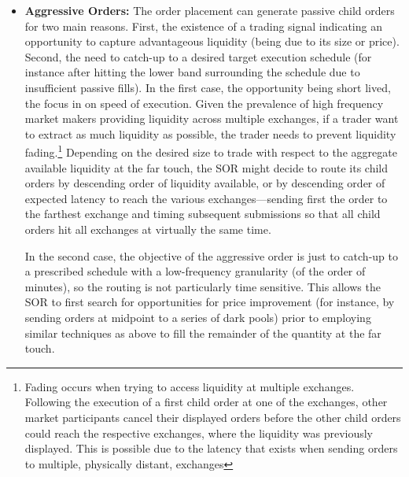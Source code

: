 \begin{itemize}
\item \textbf{Aggressive Orders:} The order placement can generate passive child orders for two main reasons. First, the existence of a trading signal indicating an opportunity to capture advantageous liquidity (being due to its size or price). Second, the need to catch-up to a desired target execution schedule (for instance after hitting the lower band surrounding the schedule due to insufficient passive fills). In the first case, the opportunity being short lived, the focus in on speed of execution. Given the prevalence of high frequency market makers providing liquidity across multiple exchanges, if a trader want to extract as much liquidity as possible, the trader needs to prevent liquidity fading.\footnote{Fading occurs when trying to access liquidity at multiple exchanges. Following the execution of a first child order at one of the exchanges, other market participants cancel their displayed orders before the other child orders could reach the respective exchanges, where the liquidity was previously displayed. This is possible due to the latency that exists when sending orders to multiple, physically distant, exchanges} Depending on the desired size to trade with respect to the aggregate available liquidity at the far touch, the SOR might decide to route its child orders by descending order of liquidity available, or by descending order of expected latency to reach the various exchanges---sending first the order to the farthest exchange and timing subsequent submissions so that all child orders hit all exchanges at virtually the same time. 


In the second case, the objective of the aggressive order is just to catch-up to a prescribed schedule with a low-frequency granularity (of the order of minutes), so the routing is not particularly time sensitive. This allows the SOR to first search for opportunities for price improvement (for instance, by sending orders at midpoint to a series of dark pools) prior to employing similar techniques as above to fill the remainder of the quantity at the far touch.



\end{itemize}
